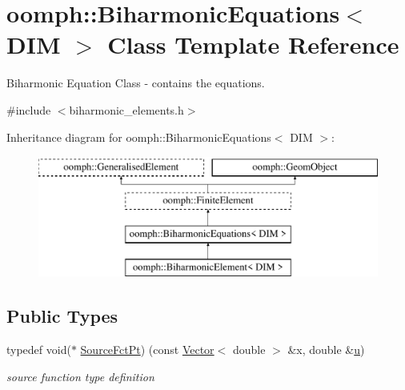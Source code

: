 \hypertarget{classoomph_1_1BiharmonicEquations}{}\section{oomph\+:\+:Biharmonic\+Equations$<$ D\+IM $>$ Class Template Reference}
\label{classoomph_1_1BiharmonicEquations}


Biharmonic Equation Class -\/ contains the equations.  




{\ttfamily \#include $<$biharmonic\+\_\+elements.\+h$>$}

Inheritance diagram for oomph\+:\+:Biharmonic\+Equations$<$ D\+IM $>$\+:\begin{figure}[H]
\begin{center}
\leavevmode
\includegraphics[height=4.000000cm]{classoomph_1_1BiharmonicEquations}
\end{center}
\end{figure}
\subsection*{Public Types}
\begin{DoxyCompactItemize}
\item 
typedef void($\ast$ \hyperlink{classoomph_1_1BiharmonicEquations_aafa48cd7bbc8ce4383224d1d2d0bfda3}{Source\+Fct\+Pt}) (const \hyperlink{classoomph_1_1Vector}{Vector}$<$ double $>$ \&x, double \&\hyperlink{classoomph_1_1BiharmonicEquations_aebe4e72a90f24cde0f34cf14287e3721}{u})
\begin{DoxyCompactList}\small\item\em source function type definition \end{DoxyCompactList}\end{DoxyCompactItemize}
